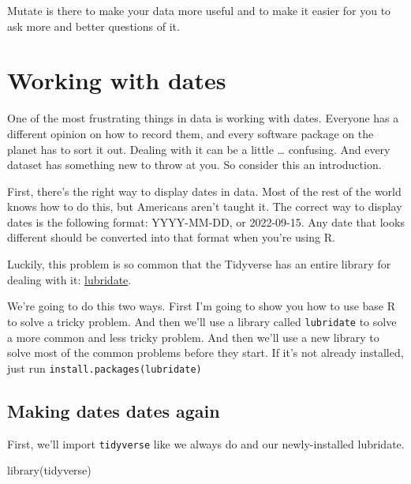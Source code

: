 \documentclass[
  letterpaper,
  DIV=11,
  numbers=noendperiod]{scrreprt}
\newenvironment{Shaded}{\begin{snugshade}}{\end{snugshade}}
\newcommand{\FunctionTok}[1]{\textcolor[rgb]{0.28,0.35,0.67}{#1}}
\newcommand{\NormalTok}[1]{\textcolor[rgb]{0.00,0.23,0.31}{#1}}
\begin{document}
Mutate is there to make your data more useful and to make it easier for
you to ask more and better questions of it.


\hypertarget{working-with-dates}{%
\chapter{Working with dates}\label{working-with-dates}}

One of the most frustrating things in data is working with dates.
Everyone has a different opinion on how to record them, and every
software package on the planet has to sort it out. Dealing with it can
be a little \ldots{} confusing. And every dataset has something new to
throw at you. So consider this an introduction.

First, there's the right way to display dates in data. Most of the rest
of the world knows how to do this, but Americans aren't taught it. The
correct way to display dates is the following format: YYYY-MM-DD, or
2022-09-15. Any date that looks different should be converted into that
format when you're using R.

Luckily, this problem is so common that the Tidyverse has an entire
library for dealing with it:
\href{https://lubridate.tidyverse.org/}{lubridate}.

We're going to do this two ways. First I'm going to show you how to use
base R to solve a tricky problem. And then we'll use a library called
\texttt{lubridate} to solve a more common and less tricky problem. And
then we'll use a new library to solve most of the common problems before
they start. If it's not already installed, just run
\texttt{install.packages(\textquotesingle{}lubridate\textquotesingle{})}

\hypertarget{making-dates-dates-again}{%
\section{Making dates dates again}\label{making-dates-dates-again}}

First, we'll import \texttt{tidyverse} like we always do and our
newly-installed lubridate.

\begin{Shaded}
\begin{Highlighting}[]
\FunctionTok{library}\NormalTok{(tidyverse)}
\end{Highlighting}
\end{Shaded}
\end{document}
